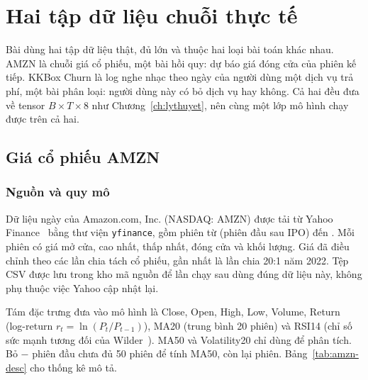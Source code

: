 \chapter{Hai tập dữ liệu chuỗi thực tế}
\label{ch:dulieu}

Bài dùng hai tập dữ liệu thật, đủ lớn và thuộc hai loại bài toán khác nhau. AMZN là chuỗi giá cổ phiếu, một bài hồi
quy: dự báo giá đóng cửa của phiên kế tiếp. KKBox Churn là log nghe nhạc theo ngày của người dùng một dịch vụ trả phí,
một bài phân loại: người dùng này có bỏ dịch vụ hay không. Cả hai đều đưa về tensor $B \times T \times 8$ như
Chương~\ref{ch:lythuyet}, nên cùng một lớp mô hình chạy được trên cả hai.

\section{Giá cổ phiếu AMZN}

\subsection{Nguồn và quy mô}

Dữ liệu ngày của Amazon.com, Inc. (NASDAQ: AMZN) được tải từ Yahoo Finance~\cite{yahooamzn} bằng thư viện
\texttt{yfinance}, gồm  phiên từ  (phiên đầu sau IPO) đến . Mỗi phiên có
giá mở cửa, cao nhất, thấp nhất, đóng cửa và khối lượng. Giá đã điều chỉnh theo các lần chia tách cổ phiếu, gần nhất là
lần chia 20:1 năm 2022. Tệp CSV được lưu trong kho mã nguồn để lần chạy sau dùng đúng dữ liệu này, không phụ thuộc
việc Yahoo cập nhật lại.


Tám đặc trưng đưa vào mô hình là Close, Open, High, Low, Volume, Return (log-return
$r_t = \ln(P_t/P_{t-1})$), MA20 (trung bình 20 phiên) và RSI14 (chỉ số sức mạnh tương đối của Wilder~\cite{wilder1978}).
MA50 và Volatility20 chỉ dùng để phân tích. Bỏ  $-$  phiên đầu chưa đủ 50 phiên để tính
MA50, còn lại  phiên. Bảng~\ref{tab:amzn-desc} cho thống kê mô tả.

\begin{table}[H]
  \centering\footnotesize
  \setlength{\tabcolsep}{4.5pt}
  \caption{Thống kê mô tả 10 đặc trưng của AMZN,  phiên}
  \label{tab:amzn-desc}
  
\end{table}

